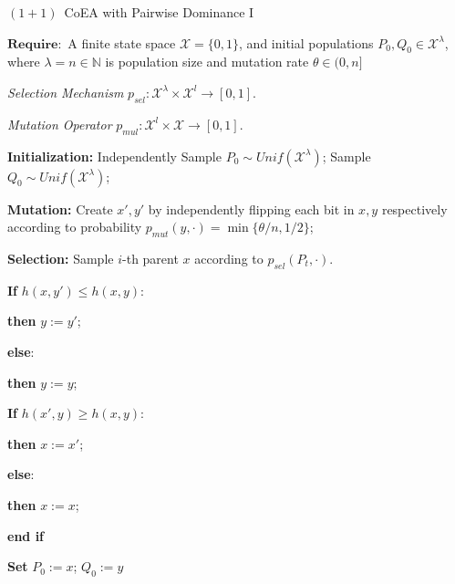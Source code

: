 \documentclass[a4paper,11pt]{report}
\theoremstyle{plain} %
\theoremstyle{definition} %
\theoremstyle{remark} %
\newcommand{\ocoea}{${(1 + 1)}$~CoEA\xspace}
\begin{document}
\begin{algorithm}
\caption{\ocoea with Pairwise Dominance I}
\label{alg:ocoea1}
$\mathbf{Require:}$  A finite state space $\mathcal{X}=\{0,1\}$, and initial populations  $P_{0}, Q_{0}\in \mathcal{X}^{\lambda }$, where $\lambda = n \in \mathbb{N}$ is population size and mutation rate $\theta \in (0,n]$ 

\textit{Selection Mechanism} $p_{sel}:\mathcal{X}^{\lambda } \times \mathcal{X}^{l} \rightarrow [0,1]$. 


\textit{Mutation Operator} $p_{mul}:\mathcal{X}^l \times \mathcal{X} \rightarrow [0,1]$.


\textbf{Initialization:}  Independently Sample $P_{0} \sim Unif(\mathcal{X}^{\lambda })$; Sample $Q_{0} \sim Unif(\mathcal{X}^{\lambda })$; 

\textbf{Mutation:} Create $x',y'$ by independently flipping each bit in $x,y$ respectively according to probability $p_{mut}(y,\cdot)= \min\{\theta/n, 1/2\}$;

\textbf{Selection:} Sample $i$-th parent $x$ according to $p_{sel}(P_{t},\cdot)$.



\quad \quad \quad  \textbf{If} $h(x,y') \leq h(x,y)$:

\quad  \quad \quad \quad    \textbf{then} $y:= y'$; 

\quad \quad \quad  \textbf{else}: 

\quad  \quad \quad \quad     \textbf{then} $y:= y$;


\quad \quad \quad \textbf{If} $h(x',y) \geq h(x,y)$:
    
\quad  \quad \quad \quad     \textbf{then} $x:= x'$; 

\quad \quad \quad  \textbf{else}: 

\quad  \quad \quad \quad     \textbf{then} $x:= x$; 

\quad  \quad \quad \textbf{end if}

\quad  \quad \quad  \textbf{Set} $P_{0}:=x$;  $Q_{0}:=y$

\end{algorithm}
\end{document}
